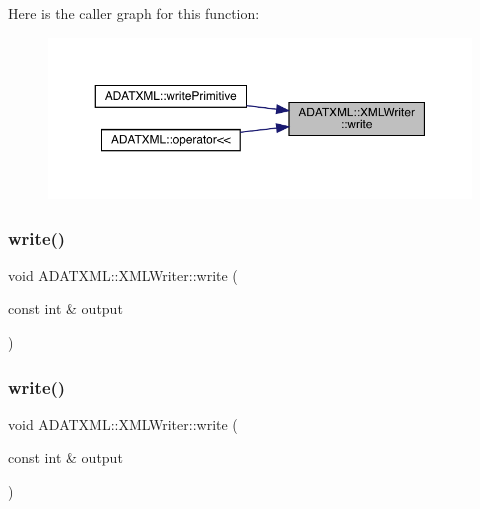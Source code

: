 Here is the caller graph for this function\+:\nopagebreak
\begin{figure}[H]
\begin{center}
\leavevmode
\includegraphics[width=350pt]{da/da7/classADATXML_1_1XMLWriter_a82f1a99241ecd26ea2bd7f3d87364ed7_icgraph}
\end{center}
\end{figure}
\mbox{\label{classADATXML_1_1XMLWriter_aa027c8bf616bdc96982bb11a2610469e}} 
\subsubsection{\texorpdfstring{write()}{write()}\hspace{0.1cm}{\footnotesize\ttfamily [3/20]}}
{\footnotesize\ttfamily void A\+D\+A\+T\+X\+M\+L\+::\+X\+M\+L\+Writer\+::write (\begin{DoxyParamCaption}\item[{const int \&}]{output }\end{DoxyParamCaption})}

\mbox{\label{classADATXML_1_1XMLWriter_aa027c8bf616bdc96982bb11a2610469e}} 
\subsubsection{\texorpdfstring{write()}{write()}\hspace{0.1cm}{\footnotesize\ttfamily [4/20]}}
{\footnotesize\ttfamily void A\+D\+A\+T\+X\+M\+L\+::\+X\+M\+L\+Writer\+::write (\begin{DoxyParamCaption}\item[{const int \&}]{output }\end{DoxyParamCaption})}

